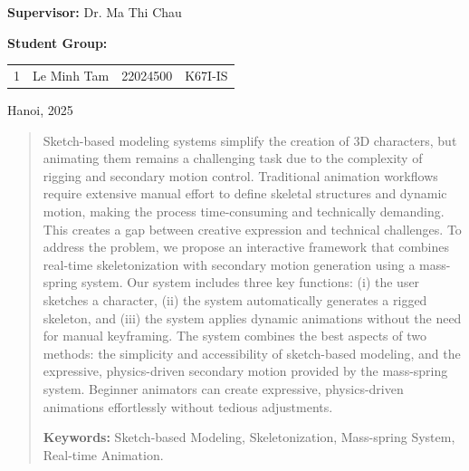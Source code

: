 \documentclass{report}
\begin{document}
\begin{titlepage}
\vspace{3mm}
\begin{center}
    \begin{spacing}{1.2}
        \textbf{Supervisor:} \hspace{5mm} Dr. Ma Thi Chau
    \end{spacing}
\end{center}
\begin{center}
    \begin{spacing}{1}
        \textbf{Student Group:}
    \end{spacing}
    \begin{tabular}{l l l l}
        1 & Le Minh Tam & 22024500 & K67I-IS \\
    \end{tabular}
\end{center}

\vspace{3 mm}
\begin{center}
    \large {Hanoi, 2025}
\end{center}
\end{titlepage}

\begin{abstract}
Sketch-based modeling systems simplify the creation of 3D characters, but animating them remains a challenging task due to the complexity of rigging and secondary motion control. Traditional animation workflows require extensive manual effort to define skeletal structures and dynamic motion, making the process time-consuming and technically demanding. This creates a gap between creative expression and technical challenges. To address the problem, we propose an interactive framework that combines real-time skeletonization with secondary motion generation using a mass-spring system. Our system includes three key functions: (i) the user sketches a character, (ii) the system automatically generates a rigged skeleton, and (iii) the system applies dynamic animations without the need for manual keyframing. The system combines the best aspects of two methods: the simplicity and accessibility of sketch-based modeling, and the expressive, physics-driven secondary motion provided by the mass-spring system. Beginner animators can create expressive, physics-driven animations effortlessly without tedious adjustments.

\textbf{Keywords:} Sketch-based Modeling, Skeletonization, Mass-spring System, Real-time Animation.
\end{abstract}

\tableofcontents
\end{document}
